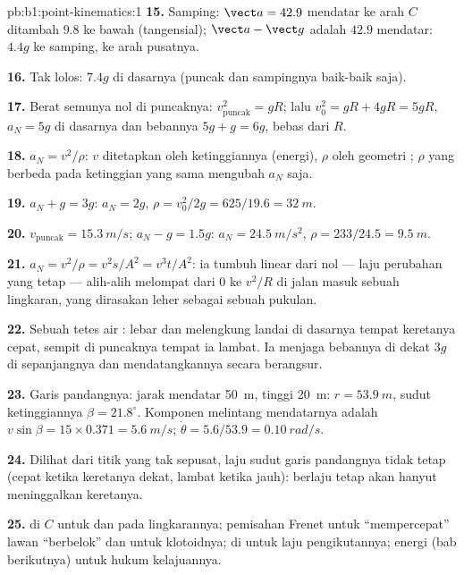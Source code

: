 \begin{solution}{pb:b1:point-kinematics:1}
\textbf{15.} Samping: $\vect a = 42.9$ mendatar ke arah $C$ ditambah $9.8$
ke bawah (tangensial); $\vect a - \vect g$ adalah $42.9$ mendatar: $4.4g$
ke samping, ke arah pusatnya.

\textbf{16.} Tak lolos: $7.4g$ di dasarnya (puncak dan sampingnya baik-baik saja).

\textbf{17.} Berat semunya nol di puncaknya: $v_{\text{puncak}}^2 = gR$;
lalu $v_0^2 = gR + 4gR = 5gR$, $a_N = 5g$ di dasarnya dan bebannya
$5g + g = 6g$, bebas dari $R$.

\textbf{18.} $a_N = v^2/\rho$: $v$ ditetapkan oleh ketinggiannya
(energi), $\rho$ oleh geometri ; $\rho$ yang berbeda pada
ketinggian yang sama mengubah $a_N$ saja.

\textbf{19.} $a_N + g = 3g$: $a_N = 2g$, $\rho = v_0^2/2g = 625/19.6 =
\qty{32}{m}$.

\textbf{20.} $v_{\text{puncak}} = \qty{15.3}{m/s}$; $a_N - g = 1.5g$: $a_N =
\qty{24.5}{m/s^2}$, $\rho = 233/24.5 = \qty{9.5}{m}$.

\textbf{21.} $a_N = v^2/\rho = v^2s/A^2 = v^3t/A^2$: ia tumbuh linear
dari nol --- laju perubahan  yang tetap --- alih-alih melompat
dari $0$ ke $v^2/R$ di jalan masuk sebuah lingkaran, yang dirasakan
leher sebagai sebuah pukulan.

\textbf{22.} Sebuah tetes air : lebar dan melengkung landai di
dasarnya tempat keretanya cepat, sempit di puncaknya tempat ia lambat.
Ia menjaga bebannya di dekat $3g$ di sepanjangnya dan mendatangkannya
secara berangsur.

\textbf{23.} Garis pandangnya: jarak mendatar \qty{50}{m}, tinggi
\qty{20}{m}: $r = \qty{53.9}{m}$, sudut ketinggiannya $\beta = 21.8^\circ$.
Komponen melintang  mendatarnya adalah $v\sin\beta = 15 \times
0.371 = \qty{5.6}{m/s}$; $\dot\theta = 5.6/53.9 = \qty{0.10}{rad/s}$.

\textbf{24.} Dilihat dari titik yang tak sepusat, laju sudut garis
pandangnya tidak tetap (cepat ketika keretanya dekat, lambat ketika
jauh):  berlaju tetap akan hanyut meninggalkan keretanya.

\textbf{25.}  di $C$ untuk  dan  pada
lingkarannya; pemisahan Frenet untuk ``mempercepat'' lawan ``berbelok''
dan untuk klotoidnya;  di  untuk laju
pengikutannya; energi (bab berikutnya) untuk hukum kelajuannya.
\end{solution}
